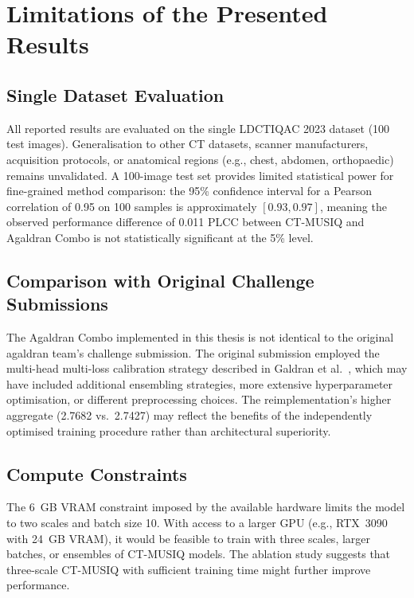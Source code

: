 \section{Limitations of the Presented Results}
\label{sec:results_limitations}

\subsection{Single Dataset Evaluation}

All reported results are evaluated on the single LDCTIQAC 2023 dataset (100 test images).
Generalisation to other CT datasets, scanner manufacturers, acquisition protocols, or
anatomical regions (e.g., chest, abdomen, orthopaedic) remains unvalidated. A 100-image
test set provides limited statistical power for fine-grained method comparison: the
95\% confidence interval for a Pearson correlation of 0.95 on 100 samples is
approximately $[0.93, 0.97]$, meaning the observed performance difference of 0.011 PLCC
between CT-MUSIQ and Agaldran Combo is not statistically significant at the 5\% level.

\subsection{Comparison with Original Challenge Submissions}

The Agaldran Combo implemented in this thesis is not identical to the original agaldran
team's challenge submission. The original submission employed the multi-head multi-loss
calibration strategy described in Galdran et al.\ \cite{galdran2022calibration}, which
may have included additional ensembling strategies, more extensive hyperparameter
optimisation, or different preprocessing choices. The reimplementation's higher aggregate
(2.7682 vs.\ 2.7427) may reflect the benefits of the independently optimised training
procedure rather than architectural superiority.

\subsection{Compute Constraints}

The 6~GB VRAM constraint imposed by the available hardware limits the model to two scales
and batch size 10. With access to a larger GPU (e.g., RTX~3090 with 24~GB VRAM), it
would be feasible to train with three scales, larger batches, or ensembles of CT-MUSIQ
models. The ablation study suggests that three-scale CT-MUSIQ with sufficient training
time might further improve performance.

